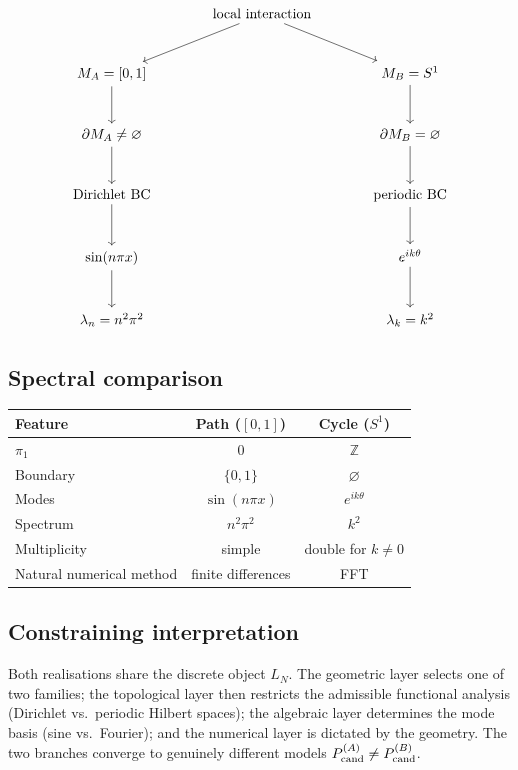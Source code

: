 \documentclass[11pt,a4paper]{article}
\theoremstyle{definition}
\theoremstyle{plain}
\newcommand{\Z}{\mathbb{Z}}
\begin{document}
\begin{equation}
\begin{tikzcd}[row sep=large, column sep=large]
  & \text{local interaction} \arrow[dl] \arrow[dr] & \\
  M_A = [0,1] \arrow[d] & & M_B = S^1 \arrow[d] \\
  \partial M_A \neq \varnothing \arrow[d] & & \partial M_B = \varnothing \arrow[d] \\
  \text{Dirichlet BC} \arrow[d] & & \text{periodic BC} \arrow[d] \\
  \sin(n \pi x) \arrow[d] & & e^{i k \theta} \arrow[d] \\
  \lambda_n = n^2 \pi^2 & & \lambda_k = k^2
\end{tikzcd}
\end{equation}

\subsection{Spectral comparison}

\begin{center}
\begin{tabular}{l|c|c}
  \toprule
  Feature & Path ($[0,1]$) & Cycle ($S^1$) \\
  \midrule
  $\pi_1$ & $0$ & $\Z$ \\
  Boundary & $\{0,1\}$ & $\varnothing$ \\
  Modes & $\sin(n \pi x)$ & $e^{ik\theta}$ \\
  Spectrum & $n^2 \pi^2$ & $k^2$ \\
  Multiplicity & simple & double for $k \neq 0$ \\
  Natural numerical method & finite differences & FFT \\
  \bottomrule
\end{tabular}
\end{center}

\subsection{Constraining interpretation}

Both realisations share the discrete object $L_N$. The geometric
layer selects one of two families; the topological layer then
restricts the admissible functional analysis (Dirichlet vs.\ periodic
Hilbert spaces); the algebraic layer determines the mode basis
(sine vs.\ Fourier); and the numerical layer is dictated by the
geometry. The two branches converge to genuinely different models
$P_{\rm cand}^{(A)} \neq P_{\rm cand}^{(B)}$.
\end{document}
